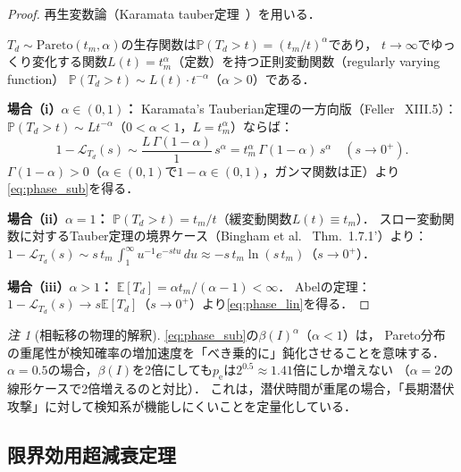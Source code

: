 \documentclass[12pt,a4paper]{article}
\theoremstyle{plain}
\theoremstyle{definition}
\theoremstyle{remark}
\newtheorem{remark}[theorem]{注}
\newcommand{\E}{\mathbb{E}}
\newcommand{\Prob}{\mathbb{P}}
\newcommand{\calL}{\mathcal{L}}
\newcommand{\pe}{p_{\mathrm{e}}}
\newcommand{\betaI}{\beta(I)}
\begin{document}
\begin{proof}
再生変数論（Karamata tauber定理~\cite{feller1971}）を用いる．

$T_d\sim\mathrm{Pareto}(t_m,\alpha)$の生存関数は$\Prob(T_d>t)=(t_m/t)^\alpha$であり，
$t\to\infty$でゆっくり変化する関数$L(t)=t_m^\alpha$（定数）を持つ正則変動関数（regularly varying function）
$\Prob(T_d>t)\sim L(t)\cdot t^{-\alpha}$（$\alpha>0$）である．

\textbf{場合（i）$\alpha\in(0,1)$：}
Karamata's Tauberian定理の一方向版（Feller~\cite{feller1971} XIII.5）：
$\Prob(T_d>t)\sim L t^{-\alpha}$（$0<\alpha<1$，$L=t_m^\alpha$）ならば：
\[
  1 - \calL_{T_d}(s) \sim \frac{L\,\Gamma(1-\alpha)}{1}\,s^{\alpha}
  = t_m^\alpha\,\Gamma(1-\alpha)\,s^\alpha
  \quad(s\to0^+).
\]
$\Gamma(1-\alpha)>0$（$\alpha\in(0,1)$で$1-\alpha\in(0,1)$，ガンマ関数は正）より\eqref{eq:phase_sub}を得る．

\textbf{場合（ii）$\alpha=1$：}
$\Prob(T_d>t)=t_m/t$（緩変動関数$L(t)\equiv t_m$）．
スロー変動関数に対するTauber定理の境界ケース（Bingham et al.~\cite{bingham1989} Thm.~1.7.1'）より：
$1-\calL_{T_d}(s)\sim s\,t_m\,\int_1^\infty u^{-1}e^{-stu}\,du\approx -s\,t_m\ln(s\,t_m)$（$s\to0^+$）．

\textbf{場合（iii）$\alpha>1$：}
$\E[T_d]=\alpha t_m/(\alpha-1)<\infty$．
Abelの定理：$1-\calL_{T_d}(s)\to s\E[T_d]$（$s\to0^+$）より\eqref{eq:phase_lin}を得る．
\end{proof}

\begin{remark}[相転移の物理的解釈]
\eqref{eq:phase_sub}の$\betaI^\alpha$（$\alpha<1$）は，
Pareto分布の重尾性が検知確率の増加速度を「べき乗的に」鈍化させることを意味する．
$\alpha=0.5$の場合，$\betaI$を2倍にしても$\pe$は$2^{0.5}\approx1.41$倍にしか増えない
（$\alpha=2$の線形ケースで2倍増えるのと対比）．
これは，潜伏時間が重尾の場合，「長期潜伏攻撃」に対して検知系が機能しにくいことを定量化している．
\end{remark}

\subsection{限界効用超減衰定理}
\end{document}
